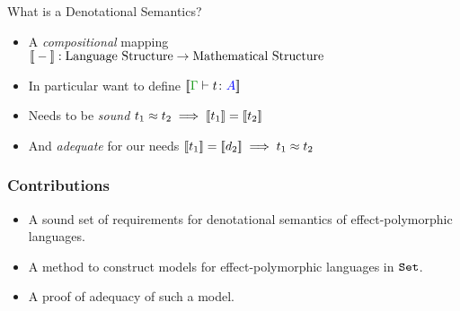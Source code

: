 \documentclass{beamer}
\newcommand\script[1]{}
\begin{document}
\begin{frame}{What is a Denotational Semantics? }
    \begin{itemize}\setlength\itemsep{3em}
        \item A \textit{compositional} mapping ${\bf [\![}-{\bf ]\!]}: \text{Language Structure} \rightarrow \text{Mathematical Structure}$
        \item In particular want to define $\deno{\gtyperelation{t}{A}}$
        \item Needs to be \textit{sound} $t_1 \approx t_2 \implies {\bf [\![}t_1{\bf ]\!]} = {\bf [\![}t_2{\bf ]\!]}$
        \item And \textit{adequate} for our needs ${\bf [\![}t_1{\bf ]\!]} = {\bf [\![}d_2{\bf ]\!]}\implies t_1 \approx t_2$
    \end{itemize}

    \script{
        - Denotational semantics is where we create a mapping between program terms and an abstract mathematical structure.
        - We want this to be compositional - meaning that each term's denotation is defined in terms of its subterms 
        - It should also be sound, meaning that equivalent program terms up-to, for example, beta-eta reduction, have equal denotations.
        - we also want it to be adequate - if two terms have equal denotations, then that should mean something useful about the relation of the two terms (e.g. can replace one by the other, etc)
    }
\end{frame}

\begin{frame}
    \frametitle{Contributions}

    \begin{itemize}\setlength\itemsep{3em}
        \item A sound set of requirements for denotational semantics of effect-polymorphic languages.
        \item A method to construct models for effect-polymorphic languages in $\texttt{Set}$.
        \item A proof of adequacy of such a model.
    \end{itemize}

    \script{
        - There are three main contributions here
            - A set of requirements to make a sound model of an effect polymorphic language
            - A construction of models for polymorphic languages in the category of Sets
            - And for a particular language I've proved adequacy.
    }
\end{frame}
\end{document}
